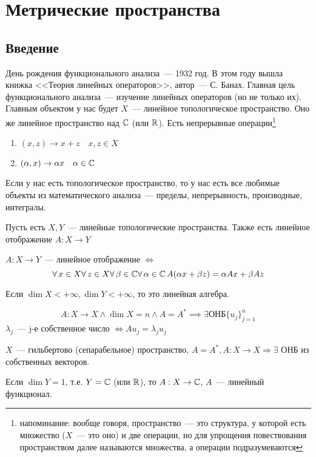 \documentclass[document]{subfiles}
\begin{document}
\part{Метрические пространства}
\chapter{Введение}
День рождения функционального анализа~--- 1932 год. В этом году вышла книжка <<Теория линейных операторов>>, автор~--- С. Банах. Главная цель функционального анализа~--- изучение линейных операторов (но не только их). Главным объектом у нас будет $X$~--- линейное топологическое пространство. Оно же линейное пространство над $\mathbb{C}$ (или $\mathbb{R}$).
Есть непрерывные операции\footnote{напоминание: вообще говоря, пространство~--- это структура, у которой есть множество ($X$~--- это оно) и две операции, но для упрощения повествования пространством далее называются множества, а операции подразумеваются}
\begin{enumerate}
    \item $(x,z) \rightarrow x + z \quad x,z \in X$
    \item $(\alpha,x) \rightarrow \alpha x \quad \alpha \in \mathbb{C}$
\end{enumerate}
Если у нас есть топологическое пространство, то у нас есть все любимые объекты из математического анализа~--- пределы, непрерывность, производные, интегралы.

Пусть есть $X,Y$~--- линейные топологические пространства. Также есть линейное отображение $A: X \rightarrow Y$
\begin{definition}
    $A: X \rightarrow Y$~--- линейное отображение $\Leftrightarrow$
    \[ \forall x \in X \forall z \in X \forall \beta \in \bC \forall \alpha \in \bC \, A(\alpha x + \beta z) = \alpha A x + \beta A z \]
\end{definition}

Если $\dim X < + \infty, \dim Y < + \infty$, то это линейная алгебра.

\[A: X \rightarrow X \land \dim X = n \land A = A^* \implies \exists \text {ОНБ} \{u_j\}_{j=1}^n \]
$\lambda_j$~--- j-е собственное число $\Leftrightarrow A u_j = \lambda_j u_j$
\begin{theorem}[Гильберт]
    $X$~--- гильбертово (сепарабельное) пространство,
    $A = A^*, A: X \rightarrow X \Rightarrow \exists$ ОНБ из собственных векторов.
\end{theorem}

Если $\dim Y = 1$, т.е. $Y = \mathbb{C}$ (или $\mathbb{R}$), то $A: X \rightarrow \mathbb{C}$, $A$~--- линейный функционал.
\end{document}
